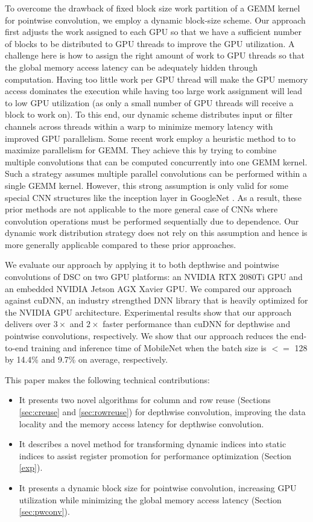 To overcome the drawback of fixed block size work partition of a GEMM kernel for pointwise convolution, we employ a dynamic block-size
scheme. Our approach first adjusts the work assigned to each GPU so that we have a sufficient number of blocks to be distributed to GPU
threads to improve the GPU utilization. A challenge here is how to assign the right amount of work to GPU threads so that the global memory
access latency can be adequately hidden through computation. Having too little work per GPU thread will make the GPU memory access
dominates the execution while having too large work assignment will lead to low GPU utilization (as only a small number of GPU threads will
receive a block to work on). To this end, our dynamic scheme distributes input or filter channels across threads within a warp to minimize
memory latency with improved GPU parallelism. Some recent work \cite{li2019coordinated,pourghassemi2020limits} employ a heuristic method to
to maximize parallelism for GEMM. They achieve this by trying to combine multiple convolutions that can be computed concurrently into one
GEMM kernel. Such a strategy assumes multiple parallel convolutions can be performed within a single GEMM kernel. However, this strong
assumption is only valid for some special CNN structures like the inception layer in GoogleNet \cite{szegedy2015going}. As a result, these
prior methods are not applicable to the more general case of CNNs where convolution operations must be performed sequentially due to
dependence. Our dynamic work distribution strategy does not rely on this assumption and hence is more generally applicable compared to
these prior approaches.

We evaluate our approach by applying it to both depthwise and pointwise convolutions of DSC on two GPU platforms: an NVIDIA RTX 2080Ti GPU
and an embedded NVIDIA Jetson AGX Xavier GPU. We compared our approach against cuDNN, an industry strengthed DNN library that is heavily
optimized for the NVIDIA GPU architecture. Experimental results show that our approach delivers over $3\times$ and $2\times$ faster
performance than cuDNN for depthwise and pointwise convolutions, respectively. We show that our approach reduces the end-to-end training
and inference time of MobileNet \FIXME{\cite{}} when the batch size is $<=$ 128 by 14.4\% and 9.7\% on average, respectively.



This paper makes the following technical contributions:
\begin{itemize}
    \item It presents two novel algorithms for column and row reuse (Sections \ref{sec:creuse} and \ref{sec:rowreuse}) for depthwise
        convolution, improving the data locality and the memory access latency for depthwise convolution.
    \item It describes a novel method for transforming dynamic indices into static indices to assist register promotion for performance
        optimization (Section \ref{exp}).
    \item It presents a dynamic block size for pointwise convolution, increasing GPU utilization while minimizing the global memory
        access latency (Section \ref{sec:pwconv}).
\end{itemize}
